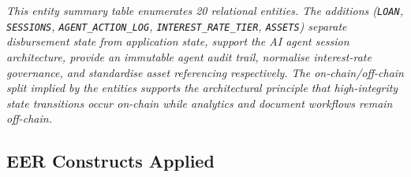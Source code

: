 \documentclass[12pt,a4paper]{report}
\begin{document}
\vspace{2pt}
\noindent\textit{\small This entity summary table enumerates 20 relational entities. The additions (\texttt{LOAN}, \texttt{SESSIONS}, \texttt{AGENT\_ACTION\_LOG}, \texttt{INTEREST\_RATE\_TIER}, \texttt{ASSETS}) separate disbursement state from application state, support the AI agent session architecture, provide an immutable agent audit trail, normalise interest-rate governance, and standardise asset referencing respectively. The on-chain/off-chain split implied by the entities supports the architectural principle that high-integrity state transitions occur on-chain while analytics and document workflows remain off-chain.}

\subsection{EER Constructs Applied}
\end{document}
